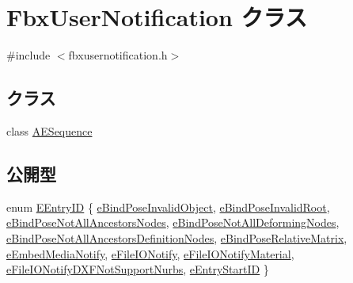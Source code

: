 \hypertarget{class_fbx_user_notification}{}\section{Fbx\+User\+Notification クラス}
\label{class_fbx_user_notification}


{\ttfamily \#include $<$fbxusernotification.\+h$>$}

\subsection*{クラス}
\begin{DoxyCompactItemize}
\item 
class \hyperlink{class_fbx_user_notification_1_1_a_e_sequence}{A\+E\+Sequence}
\end{DoxyCompactItemize}
\subsection*{公開型}
\begin{DoxyCompactItemize}
\item 
enum \hyperlink{class_fbx_user_notification_a88d8e70c3d6881a5bfe7531079ac6831}{E\+Entry\+ID} \{ \newline
\hyperlink{class_fbx_user_notification_a88d8e70c3d6881a5bfe7531079ac6831a4c254f676384d2e30d404b332edf6443}{e\+Bind\+Pose\+Invalid\+Object}, 
\hyperlink{class_fbx_user_notification_a88d8e70c3d6881a5bfe7531079ac6831a53378acb296bacae72a0e4d340800329}{e\+Bind\+Pose\+Invalid\+Root}, 
\hyperlink{class_fbx_user_notification_a88d8e70c3d6881a5bfe7531079ac6831a08c89d7d58c3a7b586c1a217e731434c}{e\+Bind\+Pose\+Not\+All\+Ancestors\+Nodes}, 
\hyperlink{class_fbx_user_notification_a88d8e70c3d6881a5bfe7531079ac6831a3022bae2c03d5844c71174cc75ff4f85}{e\+Bind\+Pose\+Not\+All\+Deforming\+Nodes}, 
\newline
\hyperlink{class_fbx_user_notification_a88d8e70c3d6881a5bfe7531079ac6831a8c586171379b87b37b16e67efaf9103e}{e\+Bind\+Pose\+Not\+All\+Ancestors\+Definition\+Nodes}, 
\hyperlink{class_fbx_user_notification_a88d8e70c3d6881a5bfe7531079ac6831a4e1de0bd5563b049f8943483a9c0d568}{e\+Bind\+Pose\+Relative\+Matrix}, 
\hyperlink{class_fbx_user_notification_a88d8e70c3d6881a5bfe7531079ac6831a38a82b2a39e3cf06f806d6ac94d8cc32}{e\+Embed\+Media\+Notify}, 
\hyperlink{class_fbx_user_notification_a88d8e70c3d6881a5bfe7531079ac6831afda820169b24edb2d185f5922c033287}{e\+File\+I\+O\+Notify}, 
\newline
\hyperlink{class_fbx_user_notification_a88d8e70c3d6881a5bfe7531079ac6831acfc6140ed3213475ad3fcc573bd57b28}{e\+File\+I\+O\+Notify\+Material}, 
\hyperlink{class_fbx_user_notification_a88d8e70c3d6881a5bfe7531079ac6831a27cc25ab372d4d9626b914ff9a2128f2}{e\+File\+I\+O\+Notify\+D\+X\+F\+Not\+Support\+Nurbs}, 
\hyperlink{class_fbx_user_notification_a88d8e70c3d6881a5bfe7531079ac6831a29ef5b9c768f0018d9352cd78c9fe5de}{e\+Entry\+Start\+ID}
 \}
\end{DoxyCompactItemize}
